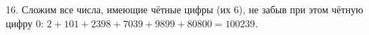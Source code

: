 16. Сложим все числа, имеющие чётные цифры (их 6), не забыв при этом чётную цифру 0: $2+101+2398+7039+9899+80800=100239.$\\
